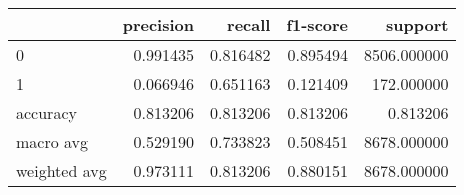 \begin{tabular}{lrrrr}
\toprule
{} &  precision &    recall &  f1-score &      support \\
\midrule
0            &   0.991435 &  0.816482 &  0.895494 &  8506.000000 \\
1            &   0.066946 &  0.651163 &  0.121409 &   172.000000 \\
accuracy     &   0.813206 &  0.813206 &  0.813206 &     0.813206 \\
macro avg    &   0.529190 &  0.733823 &  0.508451 &  8678.000000 \\
weighted avg &   0.973111 &  0.813206 &  0.880151 &  8678.000000 \\
\bottomrule
\end{tabular}
